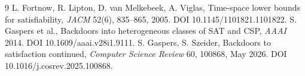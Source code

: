 \documentclass[11pt]{article}
\begin{document}
\begin{thebibliography}{9}
 L. Fortnow, R. Lipton, D. van Melkebeek, A. Viglas,
Time-space lower bounds for satisfiability,
\emph{JACM} 52(6), 835--865, 2005. DOI 10.1145/1101821.1101822.
 S. Gaspers et al.,
Backdoors into heterogeneous classes of SAT and CSP,
\emph{AAAI} 2014. DOI 10.1609/aaai.v28i1.9111.
 S. Gaspers, S. Szeider,
Backdoors to satisfaction continued,
\emph{Computer Science Review} 60, 100868, May 2026.
DOI 10.1016/j.cosrev.2025.100868.
\end{thebibliography}
\end{document}
